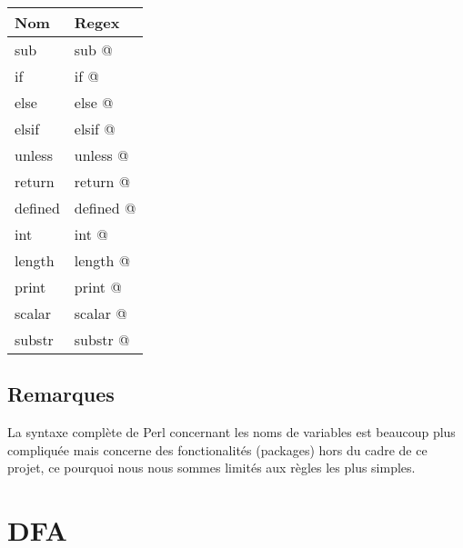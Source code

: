 \documentclass[a4paper,12pt]{article}
\begin{document}
\begin{center}
			\begin{tabular}{ | l | l |}
				\hline Nom & Regex \\
		    	\hline sub & \verb@ sub @ \\
		    	\hline if & \verb@ if @ \\
		    	\hline else & \verb@ else @ \\
		    	\hline elsif & \verb@ elsif @ \\
		    	\hline unless & \verb@ unless @ \\
		    	\hline return & \verb@ return @ \\
		    	\hline defined & \verb@ defined @ \\
		    	\hline int & \verb@ int @ \\
		    	\hline length & \verb@ length @ \\
		    	\hline print & \verb@ print @ \\
		    	\hline scalar & \verb@ scalar @ \\
		    	\hline substr & \verb@ substr @ \\
		    	\hline
		    \end{tabular}
		\end{center}
	
	\subsection{Remarques}
		La syntaxe complète de Perl concernant les noms de variables est beaucoup plus
		compliquée mais concerne des fonctionalités (packages) hors du cadre de ce
		projet, ce pourquoi nous nous sommes limités aux règles les plus simples.
	
\section{DFA}
\end{document}
